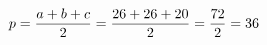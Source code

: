 \documentclass[preview]{standalone}
\begin{document}
\begin{align*}
\special{dvisvgm:raw <g id='unique000'>}p = \frac{a+b+c}{2} = \frac{26+26+20}{2} = \frac{72}{2} = 36\special{dvisvgm:raw </g>}
\end{align*}
\end{document}

